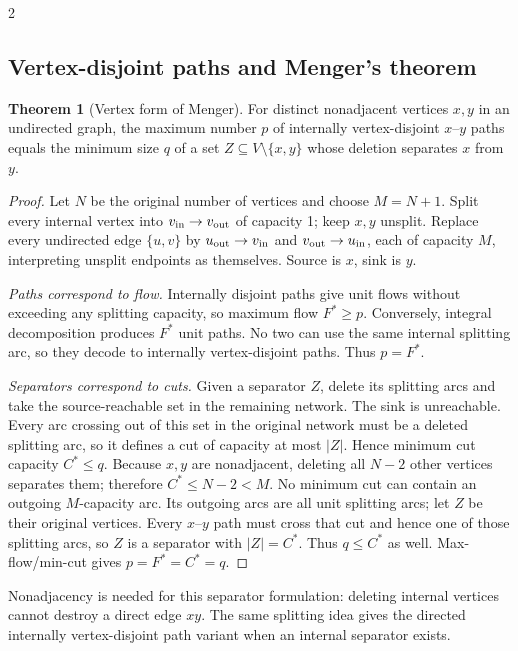 \documentclass[8pt]{extarticle}
\theoremstyle{definition}
\newtheorem{theorem}[definition]{Theorem}
\begin{document}
\begin{multicols*}{2}
\subsection{Vertex-disjoint paths and Menger's theorem}\label{nf:menger}
\begin{theorem}[Vertex form of Menger]
For distinct nonadjacent vertices $x,y$ in an undirected graph, the maximum
number $p$ of internally vertex-disjoint $x$--$y$ paths equals the minimum
size $q$ of a set $Z\subseteq V\setminus\{x,y\}$ whose deletion separates
$x$ from $y$.
\end{theorem}
\begin{proof}
Let $N$ be the original number of vertices and choose $M=N+1$.
Split every internal vertex into $v_{\rm in}\to v_{\rm out}$ of capacity 1;
keep $x,y$ unsplit. Replace every undirected edge $\{u,v\}$ by
$u_{\rm out}\to v_{\rm in}$ and $v_{\rm out}\to u_{\rm in}$, each of capacity
$M$, interpreting unsplit endpoints as themselves. Source is $x$, sink is $y$.

\emph{Paths correspond to flow.} Internally disjoint paths give unit flows
without exceeding any splitting capacity, so maximum flow $F^*\ge p$.
Conversely, integral decomposition produces $F^*$ unit paths. No two can use
the same internal splitting arc, so they decode to internally vertex-disjoint
paths. Thus $p=F^*$.

\emph{Separators correspond to cuts.} Given a separator $Z$, delete its
splitting arcs and take the source-reachable set in the remaining network.
The sink is unreachable. Every arc crossing out of this set in the original
network must be a deleted splitting arc, so it defines a cut of capacity at
most $|Z|$. Hence minimum cut capacity $C^*\le q$.
Because $x,y$ are nonadjacent, deleting all $N-2$ other vertices separates
them; therefore $C^*\le N-2<M$. No minimum cut can contain an outgoing
$M$-capacity arc. Its outgoing arcs are all unit splitting arcs; let $Z$
be their original vertices. Every $x$--$y$ path must cross that cut and hence
one of those splitting arcs, so $Z$ is a separator with $|Z|=C^*$.
Thus $q\le C^*$ as well. Max-flow/min-cut gives $p=F^*=C^*=q$.
\end{proof}
Nonadjacency is needed for this separator formulation: deleting internal
vertices cannot destroy a direct edge $xy$. The same splitting idea gives
the directed internally vertex-disjoint path variant when an internal
separator exists.


\end{multicols*}
\end{document}
